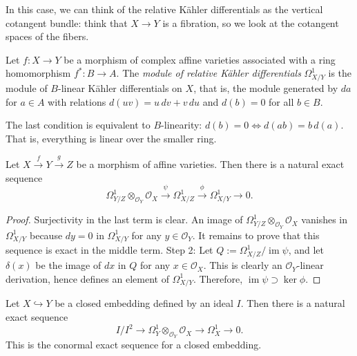 In this case, we can think of the
relative Kähler differentials
as the vertical cotangent bundle:
think that $X \to Y$ is a fibration,
so we look at the cotangent spaces
of the fibers.

\begin{definition}
\label{definition-relative-kahler-differentials}
Let $f:X \to Y$ be a morphism of complex
affine varieties associated with a ring
homomorphism $f^\ast:B\to A$. The \emph{module of relative K\"ahler differentials}
$\Omega^1_{X/Y}$ is the module of
$B$-linear K\"ahler differentials on $X$,
that is, the module generated by $da$ for
$a \in A$ with relations
$d(uv)=u\,dv+v\,du$ and $d(b)=0$ for all
$b\in B$.
\end{definition}

\begin{remark}
\label{remark-relative-kahler-differentials}
The last condition is equivalent to
$B$-linearity:
$d(b)=0 \iff d(ab)=b\,d(a)$.
That is, everything is linear
over the smaller ring.
\end{remark}

\begin{proposition}
\label{proposition-conormal-exact-sequence}
Let $X \xrightarrow{f} Y \xrightarrow{g} Z$
be a morphism of affine varieties.
Then there is a natural exact sequence
$$
\Omega^1_{Y/Z}\otimes_{\mathcal O_Y}\mathcal O_X
\xrightarrow{\psi}
\Omega^1_{X/Z}
\xrightarrow{\phi}
\Omega^1_{X/Y}\to 0.
$$
\end{proposition}

\begin{proof}
Surjectivity in the last term is clear. An
image of $\Omega^1_{Y/Z}\otimes_{\mathcal O_Y}
\mathcal O_X$ vanishes in $\Omega^1_{X/Y}$
because $dy=0$ in $\Omega^1_{X/Y}$ for any
$y\in \mathcal O_Y$. It remains to prove
that this sequence is exact in the middle
term.
\medskip\noindent
Step 2: Let
$Q:=\Omega^1_{X/Z}/\operatorname{im}\psi$,
and let $\delta(x)$ be the image of $dx$ in
$Q$ for any $x\in \mathcal O_X$. This is
clearly an $\mathcal O_Y$-linear derivation,
hence defines an element of
$\Omega^1_{X/Y}$. Therefore,
$\operatorname{im}\psi \supset \ker\phi$.
\end{proof}

\begin{corollary}
\label{lemma-conormal-exact-sequence-ideal}
Let $X\hookrightarrow Y$ be a closed
embedding defined by an ideal $I$. Then
there is a natural exact sequence
$$
I/I^2\longrightarrow
\Omega^1_Y\otimes_{\mathcal O_Y}\mathcal O_X
\longrightarrow \Omega^1_X\longrightarrow0.
$$
This is the conormal exact sequence for a
closed embedding.
\end{corollary}

